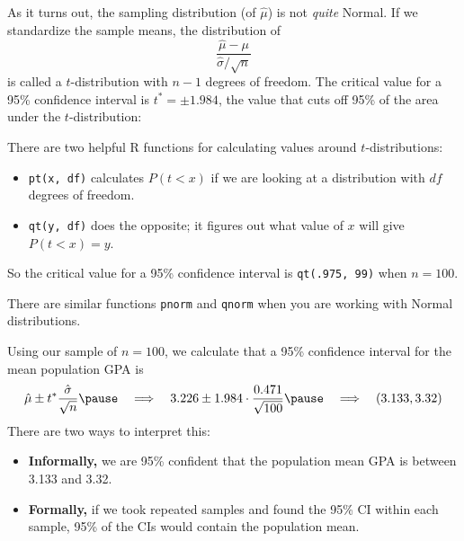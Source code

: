 \documentclass{beamer}\usepackage[]{graphicx}\usepackage[]{color}
\newenvironment{knitrout}{}{} %
\begin{document}
\begin{darkframes}
\begin{frame}
As it turns out, the sampling distribution (of $\hat\mu$) is not \emph{quite} Normal. If we standardize the sample means, the distribution of \[ \frac{\hat\mu - \mu}{ \hat\sigma/\sqrt n } \] is called a $t$-distribution with $n-1$ degrees of freedom. \pause The critical value for a 95\% confidence interval is $t^*=\pm1.984$, the value that cuts off 95\% of the area under the $t$-distribution:

\begin{knitrout}


\end{knitrout}
\end{frame}


\begin{frame}[fragile]
There are two helpful R functions for calculating values around $t$-distributions:
\begin{itemize}[<+->]
  \item \verb|pt(x, df)| calculates $P(t<x)$ if we are looking at a distribution with $df$ degrees of freedom. \pause
  \item \verb|qt(y, df)| does the opposite; it figures out what value of $x$ will give $P(t<x)=y$. \pause
\end{itemize}
So the critical value for a 95\% confidence interval is \verb|qt(.975, 99)| when $n=100$. \pause\bigskip

There are similar functions \verb|pnorm| and \verb|qnorm| when you are working with Normal distributions.
\end{frame}

\begin{frame}
Using our sample of $n=100$, we calculate that a 95\% confidence interval for the mean population GPA is
\[
  \hat\mu \pm t^* \frac{\hat\sigma}{\sqrt n}
  \pause\quad\Longrightarrow\quad
  3.226 \pm 1.984\cdot\frac{0.471}{\sqrt{100}}
  \pause\quad\Longrightarrow\quad
  (3.133, 3.32)
\]
\pause
There are two ways to interpret this:
\begin{itemize}
  \item \textbf{Informally,} we are 95\% confident that the population mean GPA is between 3.133 and 3.32. \pause
  \item \textbf{Formally,} if we took repeated samples and found the 95\% CI within each sample, 95\% of the CIs would contain the population mean.
\end{itemize}
\end{frame}



\end{darkframes}
\end{document}

